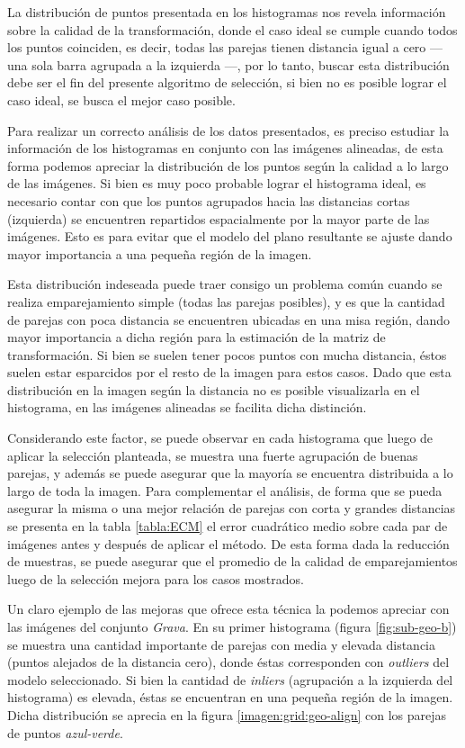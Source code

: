 La distribución de puntos presentada en los histogramas nos revela información sobre la calidad de la transformación, donde el caso ideal se cumple cuando todos los puntos coinciden, es decir, todas las parejas tienen distancia igual a cero --- una sola barra agrupada a la izquierda ---, por lo tanto, buscar esta distribución debe ser el fin del presente algoritmo de selección, si bien no es posible lograr el caso ideal, se busca el mejor caso posible. 

Para realizar un correcto análisis de los datos presentados, es preciso estudiar la información de los histogramas en conjunto con las imágenes alineadas, de esta forma podemos apreciar la distribución de los puntos según la calidad a lo largo de las imágenes. Si bien es muy poco probable lograr el histograma ideal, es necesario contar con que los puntos agrupados hacia las distancias cortas (izquierda) se encuentren repartidos espacialmente por la mayor parte de las imágenes. Esto es para evitar que el modelo del plano resultante se ajuste dando mayor importancia a una pequeña región de la imagen.

Esta distribución indeseada puede traer consigo un problema común cuando se realiza emparejamiento simple (todas las parejas posibles), y es que la cantidad de parejas con poca distancia se encuentren ubicadas en una misa región, dando mayor importancia a dicha región para la estimación de la matriz de transformación. Si bien se suelen tener pocos puntos con mucha distancia, éstos suelen estar esparcidos por el resto de la imagen para estos casos. Dado que esta distribución en la imagen según la distancia no es posible visualizarla en el histograma, en las imágenes alineadas se facilita dicha distinción.

Considerando este factor, se puede observar en cada histograma que luego de aplicar la selección planteada, se muestra una fuerte agrupación de buenas parejas, y además se puede asegurar que la mayoría se encuentra distribuida a lo largo de toda la imagen. Para complementar el análisis, de forma que se pueda asegurar la misma o una mejor relación de parejas con corta y grandes distancias se presenta en la tabla \ref{tabla:ECM} el error cuadrático medio sobre cada par de imágenes antes y después de aplicar el método. De esta forma dada la reducción de muestras, se puede asegurar que el promedio de la calidad de emparejamientos luego de la selección mejora para los casos mostrados.

Un claro ejemplo de las mejoras que ofrece esta técnica la podemos apreciar con las imágenes del conjunto \textit{Grava}. En su primer histograma (figura \ref{fig:sub-geo-b}) se muestra una cantidad importante de parejas con media y elevada distancia (puntos alejados de la distancia cero), donde éstas corresponden con \textit{outliers} del modelo seleccionado. Si bien la cantidad  de \textit{inliers} (agrupación a la izquierda del histograma) es elevada, éstas se encuentran en una pequeña región de la imagen. Dicha distribución se aprecia en la figura \ref{imagen:grid:geo-align} con los parejas de puntos \textit{azul-verde}. 

